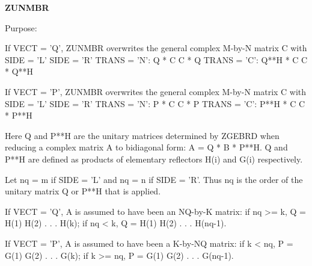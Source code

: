 {\bfseries Z\+U\+N\+M\+B\+R} 

 \begin{DoxyParagraph}{Purpose\+: }
\begin{DoxyVerb} If VECT = 'Q', ZUNMBR overwrites the general complex M-by-N matrix C
 with
                 SIDE = 'L'     SIDE = 'R'
 TRANS = 'N':      Q * C          C * Q
 TRANS = 'C':      Q**H * C       C * Q**H

 If VECT = 'P', ZUNMBR overwrites the general complex M-by-N matrix C
 with
                 SIDE = 'L'     SIDE = 'R'
 TRANS = 'N':      P * C          C * P
 TRANS = 'C':      P**H * C       C * P**H

 Here Q and P**H are the unitary matrices determined by ZGEBRD when
 reducing a complex matrix A to bidiagonal form: A = Q * B * P**H. Q
 and P**H are defined as products of elementary reflectors H(i) and
 G(i) respectively.

 Let nq = m if SIDE = 'L' and nq = n if SIDE = 'R'. Thus nq is the
 order of the unitary matrix Q or P**H that is applied.

 If VECT = 'Q', A is assumed to have been an NQ-by-K matrix:
 if nq >= k, Q = H(1) H(2) . . . H(k);
 if nq < k, Q = H(1) H(2) . . . H(nq-1).

 If VECT = 'P', A is assumed to have been a K-by-NQ matrix:
 if k < nq, P = G(1) G(2) . . . G(k);
 if k >= nq, P = G(1) G(2) . . . G(nq-1).\end{DoxyVerb}
 
\end{DoxyParagraph}

